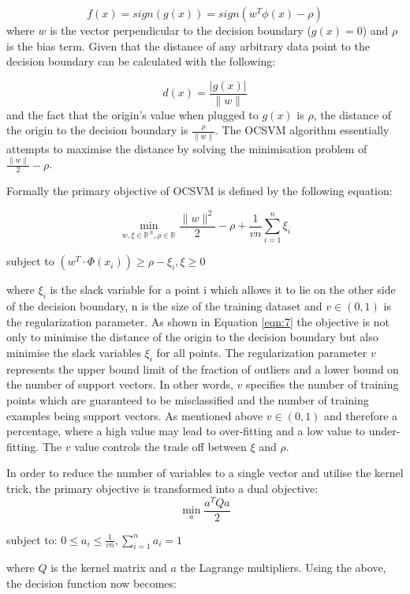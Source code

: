 \documentclass{mpaper}
\begin{document}
\begin{equation}
    f(x) = sign(g(x)) = sign(w^T\phi(x) - \rho)
\end{equation}
where $w$ is the vector perpendicular to the decision boundary ($g(x) = 0 $) and $\rho$ is the bias term. 
Given that the distance of any arbitrary data point to the decision boundary can be calculated with the following:

\begin{equation}
    d(x) = \frac{|g(x)|}{\parallel w \parallel}
\end{equation}
and the fact that the origin's value when plugged to $g(x)$ is $\rho$, the distance of the origin to the decision boundary is $\frac{\rho}{\parallel w\parallel}$. The OCSVM algorithm essentially attempts to maximise the distance by solving the minimisation problem of $\frac{\parallel w \parallel}{2} - \rho$.

Formally the primary objective of OCSVM is defined by the following equation:

\begin{equation}\label{eqn:7}
    \min_{w, \xi \in \mathbb{R}^N, \rho\in\mathbb{R}} \frac{\parallel{w}\parallel^2}{2} - \rho + \frac{1}{vn}\sum_{i=1}^n \xi_i 
\end{equation}
\begin{center}
subject to $(w^T \cdot \Phi(x_i)) \geq \rho - \xi_i, \xi \geq 0$
\end{center}
where $\xi_i$ is the slack variable for a point i which allows it to lie on the other side of the decision boundary, n is the size of the training dataset and $v \in (0,1)$ is the regularization parameter. As shown in Equation \ref{eqn:7} the objective is not only to minimise the distance of the origin to the decision boundary but also minimise the slack variables $\xi_i$ for all points. The regularization parameter $v$ represents the upper bound limit of the fraction of outliers and a lower bound on the number of support vectors. In other words, $v$ specifies the number of training points which are guaranteed to be misclassified and the number of training examples being support vectors. As mentioned above $v \in (0,1)$ and therefore a percentage, where a high value may lead to over-fitting and a low value to under-fitting. The $v$ value controls the trade off between $\xi$ and $\rho$.

In order to reduce the number of variables to a single vector and utilise the kernel trick, the primary objective is transformed into a dual objective:
\begin{equation}
    \min_a \frac{a^TQa}{2}
\end{equation}
\begin{center}
    subject to: $0 \leq a_i \leq \frac{1}{vn}, \sum_{i=1}^n a_i = 1$
\end{center}
where $Q$ is the kernel matrix and $a$ the Lagrange multipliers. Using the above, the decision function now becomes:
\end{document}
